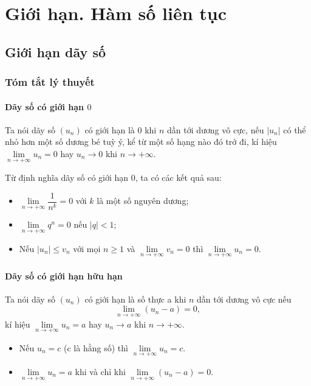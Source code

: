 \chapter{Giới hạn. Hàm số liên tục}
\section{Giới hạn dãy số}
\subsection{Tóm tắt lý thuyết}
\begin{tomtat}
	\subsubsection{Dãy số có giới hạn $0$}
	\begin{dn}
		Ta nói dãy số $\left(u_{n}\right)$ có giới hạn là $0$ khi $n$ dần tới dương vô cực, nếu $\left|u_{n}\right|$ có thể nhỏ hơn một số dương bé tuỳ ý, kể từ một số hạng nào đó trở đi, kí hiệu $\lim \limits_{n \rightarrow+\infty} u_{n}=0$ hay $u_{n} \rightarrow 0$ khi $n \rightarrow+\infty$.
	\end{dn}
Từ định nghĩa dãy số có giới hạn $0$, ta có các kết quả sau:
\begin{itemize}
	\item $\lim \limits_{n \rightarrow+\infty} \dfrac{1}{n^{k}}=0$ với $k$ là một số nguyên dương;	
	\item $\lim \limits_{n \rightarrow+\infty} q^{n}=0$ nếu $|q|<1$;	
	\item Nếu $\left|u_{n}\right| \leq v_{n}$ với mọi $n \geq 1$ và $\lim \limits_{n \rightarrow+\infty} v_{n}=0$ thì $\lim \limits_{n \rightarrow+\infty} u_{n}=0$.	
\end{itemize}
	\subsubsection{Dãy số có giới hạn hữu hạn}
	\begin{dn}
		Ta nói dãy số $\left(u_{n}\right)$ có giới hạn là số thực a khi $n$ dần tới dương vô cực nếu $$\lim \limits_{n \rightarrow+\infty}\left(u_{n}-a\right)=0,$$ kí hiệu $\lim \limits_{n \rightarrow+\infty} u_{n}=a$ hay $u_{n} \rightarrow a$ khi $n \rightarrow+\infty$. 
	\end{dn}
\begin{itemize}
	\item Nếu $u_{n}=c$ (c là hằng số) thì $\lim \limits_{n \rightarrow+\infty} u_{n}=c$. 
	\item $\lim \limits_{n \rightarrow+\infty} u_{n}=a$ khi và chỉ khi $\lim \limits_{n \rightarrow+\infty}\left(u_{n}-a\right)=0$.
\end{itemize}

\end{tomtat}
